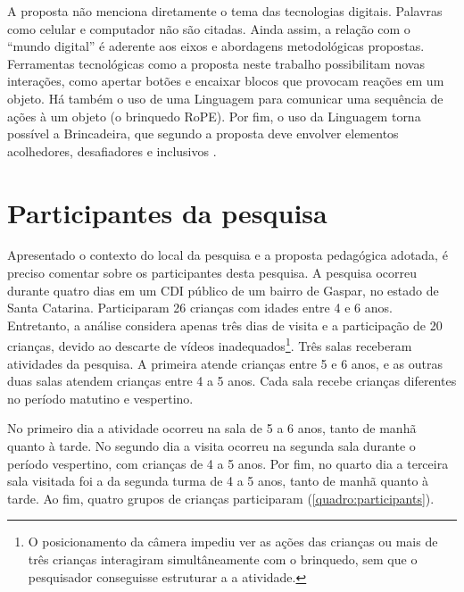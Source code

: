 A proposta não menciona diretamente o tema das tecnologias digitais. Palavras como celular e computador não são citadas. Ainda assim, a relação com o “mundo digital” é aderente aos eixos e abordagens metodológicas propostas. Ferramentas tecnológicas como a proposta neste trabalho possibilitam novas interações, como apertar botões e encaixar blocos que provocam reações em um objeto. Há também o uso de uma Linguagem para comunicar uma sequência de ações à um objeto (o brinquedo RoPE). Por fim, o uso da Linguagem torna possível a Brincadeira, que segundo a proposta deve envolver elementos acolhedores, desafiadores e inclusivos \cite[p.50]{gaspar_proposta_2010}. 


\section{Participantes da pesquisa}
\label{sec:participantes}
Apresentado o contexto do local da pesquisa e a proposta pedagógica adotada, é preciso comentar sobre os participantes desta pesquisa. A pesquisa ocorreu durante quatro dias em um CDI público de um bairro de Gaspar, no estado de Santa Catarina. Participaram 26 crianças com idades entre 4 e 6 anos. Entretanto, a análise considera apenas três dias de visita e a participação de 20 crianças, devido ao descarte de vídeos inadequados\footnote{O posicionamento da câmera impediu ver as ações das crianças ou mais de três crianças interagiram simultâneamente com o brinquedo, sem que o pesquisador conseguisse estruturar a a atividade.}. Três salas receberam atividades da pesquisa. A primeira atende crianças entre 5 e 6 anos, e as outras duas salas atendem crianças entre 4 a 5 anos. Cada sala recebe crianças diferentes no período matutino e vespertino.

No primeiro dia a atividade ocorreu na sala de 5 a 6 anos, tanto de manhã quanto à tarde. No segundo dia a visita ocorreu na segunda sala durante o período vespertino, com crianças de 4 a 5 anos. Por fim, no quarto dia a terceira sala visitada foi a da segunda turma de 4 a 5 anos, tanto de manhã quanto à tarde. Ao fim, quatro grupos de crianças participaram (\autoref{quadro:participants}).

